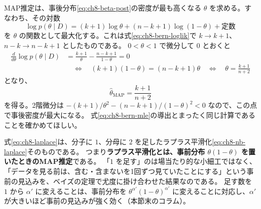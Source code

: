 MAP推定は、事後分布\eqref{eq:ch8-beta-post}の密度が最も高くなる $\theta$ を求める。すなわち、その対数
\begin{equation}
  \log p(\theta \mid D) = (k + 1)\log\theta + (n - k + 1)\log(1 - \theta) + \text{定数}
  \label{eq:ch8-beta-logpost}
\end{equation}
を $\theta$ の関数として最大化する。これは式\eqref{eq:ch8-bern-loglik}で $k \to k + 1$、$n - k \to n - k + 1$ としたものである。
$0 < \theta < 1$ で微分して $0$ とおくと
\begin{align*}
  \frac{d}{d\theta}\log p(\theta \mid D)
  &= \frac{k + 1}{\theta} - \frac{n - k + 1}{1 - \theta} = 0 \\
  &\quad\Longleftrightarrow\quad (k + 1)(1 - \theta) = (n - k + 1)\theta
  \quad\Longleftrightarrow\quad \theta = \frac{k + 1}{n + 2}
\end{align*}
となり、
\begin{equation}
  \hat{\theta}_{\mathrm{MAP}} = \frac{k + 1}{n + 2}
  \label{eq:ch8-laplace}
\end{equation}
を得る。2階微分は $-(k + 1)/\theta^2 - (n - k + 1)/(1 - \theta)^2 < 0$ なので、この点で事後密度が最大になる。
式\eqref{eq:ch8-bern-mle}の導出とまったく同じ計算であることを確かめてほしい。

式\eqref{eq:ch8-laplace}は、分子に $1$、分母に $2$ を足したラプラス平滑化\eqref{eq:ch8-nb-laplace}そのものである。
つまり\textbf{ラプラス平滑化とは、事前分布 $\theta(1 - \theta)$ を置いたときのMAP推定}である。
「$1$ を足す」のは場当たり的な小細工ではなく、「データを見る前は、含む・含まないを1回ずつ見ていたことにする」という事前の見込みを、ベイズの定理で尤度に掛け合わせた結果なのである。
足す数を $1$ から $\alpha'$ に変えることは、事前分布を $\theta^{\alpha'}(1 - \theta)^{\alpha'}$ に変えることに対応し、$\alpha'$ が大きいほど事前の見込みが強く効く（本節末のコラム）。

